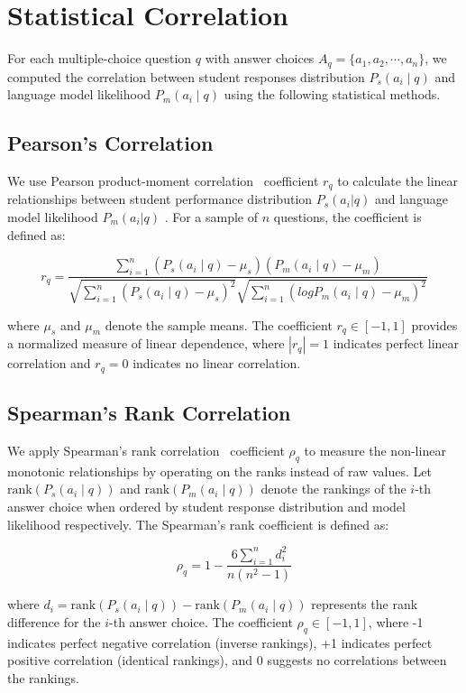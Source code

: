 \section{Statistical Correlation}
\label{app:stats-corr}
For each multiple-choice question $q$ with answer choices $A_q = \{a_1, a_2, \cdots, a_n \}$, we computed the correlation between student responses distribution $P_s(a_i \mid q)$ and language model likelihood $P_m(a_i \mid q)$ using the following statistical methods.

\subsection{Pearson's Correlation}
We use Pearson product-moment correlation~\cite{freedman2007statistics} coefficient $r_q$ to calculate the linear relationships between student performance distribution $P_s(a_i|q)$ and language model likelihood $P_m(a_i|q)$ . For a sample of $n$ questions, the coefficient is defined as:

$$r_q = \frac{\sum_{i=1}^n (P_s(a_i \mid q) - \mu_s)(P_m(a_i \mid q) - \mu_m)}{\sqrt{\sum_{i=1}^n (P_s(a_i \mid q) - \mu_s)^2}\sqrt{\sum_{i=1}^n (log P_m(a_i \mid q) - \mu_m)^2}}$$

where $\mu_s$ and $\mu_m$ denote the sample means. The coefficient $r_q \in [-1, 1]$ provides a normalized measure of linear dependence, where $|r_q| = 1$ indicates perfect linear correlation and $r_q = 0$ indicates no linear correlation. 

\subsection{Spearman's Rank Correlation}
We apply Spearman's rank correlation~\cite{zar2005spearman} coefficient $\rho_q$ to measure the non-linear monotonic relationships by operating on the ranks instead of raw values. Let $\text{rank}(P_s(a_i \mid q))$ and $\text{rank}(P_m(a_i \mid q))$ denote the rankings of the $i$-th answer choice when ordered by student response distribution and model likelihood respectively. The Spearman's rank coefficient is defined as:

$$\rho_q = 1 - \frac{6\sum_{i=1}^n d_i^2}{n(n^2-1)}$$

where $d_i = \text{rank}(P_s(a_i \mid q)) - \text{rank}(P_m(a_i \mid q))$ represents the rank difference for the $i$-th answer choice. The coefficient $\rho_q \in [-1, 1]$, where -1 indicates perfect negative correlation (inverse rankings), +1 indicates perfect positive correlation (identical rankings), and 0 suggests no correlations between the rankings.


